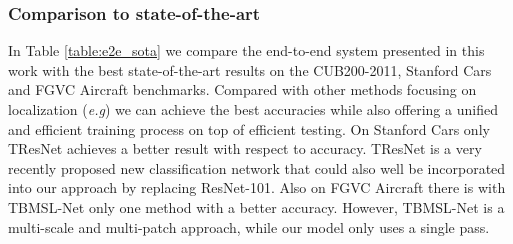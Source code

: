 \documentclass{bmvc2k}
\def\eg{\emph{e.g}\bmvaOneDot}
\begin{document}
\subsubsection{Comparison to state-of-the-art}
In Table \ref{table:e2e_sota} we compare the end-to-end system presented in this work with the best state-of-the-art results on the CUB200-2011, Stanford Cars and FGVC Aircraft benchmarks. Compared with other methods focusing on localization (\eg \cite{fu2017look,simonelli2018increasingly,Hanselmann_2020_WACV}) we can achieve the best accuracies while also offering a unified and efficient training process on top of efficient testing. On Stanford Cars only TResNet \cite{ridnik2020tresnet} achieves a better result with respect to accuracy. TResNet is a very recently proposed new classification network that could also well be incorporated into our approach by replacing ResNet-101. Also on FGVC Aircraft there is with TBMSL-Net \cite{zhang2020three} only one method with a better accuracy. However, TBMSL-Net is a multi-scale and multi-patch approach, while our model only uses a single pass.
\end{document}
